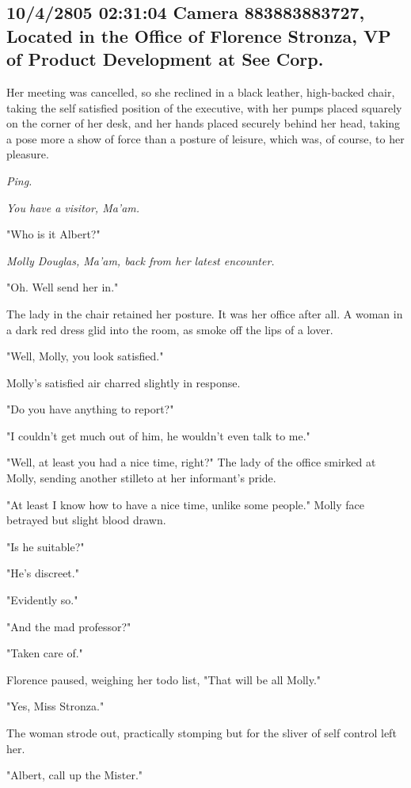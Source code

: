 \documentclass[12pt]{article}
\begin{document}
\subsection*{10/4/2805 02:31:04 Camera 883883883727, Located in the Office of Florence Stronza, VP of Product Development at See Corp.}
\label{sec:org0598dcf}

Her meeting was cancelled, so she reclined in a black leather, high-backed chair, taking the self satisfied position of the executive, with her pumps placed squarely on the corner of her desk, and her hands placed securely behind her head, taking a pose more a show of force than a posture of leisure, which was, of course, to her pleasure.

\emph{Ping.}

\emph{You have a visitor, Ma'am.}

"Who is it Albert?"

\emph{Molly Douglas, Ma'am, back from her latest encounter.}

"Oh. Well send her in."

The lady in the chair retained her posture. It was her office after all. A woman in a dark red dress glid into the room, as smoke off the lips of a lover.

"Well, Molly, you look satisfied."

Molly's satisfied air charred slightly in response.

"Do you have anything to report?"

"I couldn't get much out of him, he wouldn't even talk to me."

"Well, at least you had a nice time, right?" The lady of the office smirked at Molly, sending another stilleto at her informant's pride.

"At least I know how to have a nice time, unlike some people." Molly face betrayed but slight blood drawn.

"Is he suitable?"

"He's discreet."

"Evidently so." 

"And the mad professor?"

"Taken care of."

Florence paused, weighing her todo list, "That will be all Molly."

"Yes, Miss Stronza."

The woman strode out, practically stomping but for the sliver of self control left her.

"Albert, call up the Mister."
\end{document}
